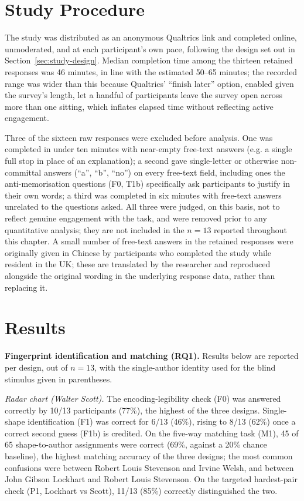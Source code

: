 \documentclass[logo,msc]{infthesis}
\begin{document}
\section{Study Procedure}
\label{sec:study-procedure}

The study was distributed as an anonymous Qualtrics link and completed online, unmoderated, and at each participant's own pace, following the design set out in Section~\ref{sec:study-design}. Median completion time among the thirteen retained responses was 46 minutes, in line with the estimated 50--65 minutes; the recorded range was wider than this because Qualtrics' ``finish later'' option, enabled given the survey's length, let a handful of participants leave the survey open across more than one sitting, which inflates elapsed time without reflecting active engagement.

Three of the sixteen raw responses were excluded before analysis. One was completed in under ten minutes with near-empty free-text answers (e.g. a single full stop in place of an explanation); a second gave single-letter or otherwise non-committal answers (``a'', ``b'', ``no'') on every free-text field, including ones the anti-memorisation questions (F0, T1b) specifically ask participants to justify in their own words; a third was completed in six minutes with free-text answers unrelated to the questions asked. All three were judged, on this basis, not to reflect genuine engagement with the task, and were removed prior to any quantitative analysis; they are not included in the $n=13$ reported throughout this chapter. A small number of free-text answers in the retained responses were originally given in Chinese by participants who completed the study while resident in the UK; these are translated by the researcher and reproduced alongside the original wording in the underlying response data, rather than replacing it.

\section{Results}
\label{sec:fp-results}

\textbf{Fingerprint identification and matching (RQ1).} Results below are reported per design, out of $n=13$, with the single-author identity used for the blind stimulus given in parentheses.

\emph{Radar chart (Walter Scott).} The encoding-legibility check (F0) was answered correctly by 10/13 participants (77\%), the highest of the three designs. Single-shape identification (F1) was correct for 6/13 (46\%), rising to 8/13 (62\%) once a correct second guess (F1b) is credited. On the five-way matching task (M1), 45 of 65 shape-to-author assignments were correct (69\%, against a 20\% chance baseline), the highest matching accuracy of the three designs; the most common confusions were between Robert Louis Stevenson and Irvine Welsh, and between John Gibson Lockhart and Robert Louis Stevenson. On the targeted hardest-pair check (P1, Lockhart vs Scott), 11/13 (85\%) correctly distinguished the two.
\end{document}
